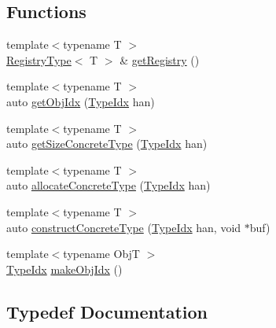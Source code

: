 \subsection*{Functions}
\begin{DoxyCompactItemize}
\item 
{\footnotesize template$<$typename T $>$ }\\\hyperlink{namespacecheckpoint_1_1dispatch_1_1vrt_1_1objregistry_a052bc9d365db250a655ce65d920c5980}{Registry\+Type}$<$ T $>$ \& \hyperlink{namespacecheckpoint_1_1dispatch_1_1vrt_1_1objregistry_acf7bcbb09d5efae1e40034dec911d4c1}{get\+Registry} ()
\item 
{\footnotesize template$<$typename T $>$ }\\auto \hyperlink{namespacecheckpoint_1_1dispatch_1_1vrt_1_1objregistry_a76f3c63243a48165f3e03b90837e2e8a}{get\+Obj\+Idx} (\hyperlink{namespacecheckpoint_1_1dispatch_1_1vrt_acd3f9e6b091bcfbc23dc35ea8ef45d3b}{Type\+Idx} han)
\item 
{\footnotesize template$<$typename T $>$ }\\auto \hyperlink{namespacecheckpoint_1_1dispatch_1_1vrt_1_1objregistry_a34c0cf2100791018c2b07a67a71277db}{get\+Size\+Concrete\+Type} (\hyperlink{namespacecheckpoint_1_1dispatch_1_1vrt_acd3f9e6b091bcfbc23dc35ea8ef45d3b}{Type\+Idx} han)
\item 
{\footnotesize template$<$typename T $>$ }\\auto \hyperlink{namespacecheckpoint_1_1dispatch_1_1vrt_1_1objregistry_a744a3536afb9023749a6857bd1ec9f83}{allocate\+Concrete\+Type} (\hyperlink{namespacecheckpoint_1_1dispatch_1_1vrt_acd3f9e6b091bcfbc23dc35ea8ef45d3b}{Type\+Idx} han)
\item 
{\footnotesize template$<$typename T $>$ }\\auto \hyperlink{namespacecheckpoint_1_1dispatch_1_1vrt_1_1objregistry_a6fa4c97dc40026a2fe6a249e1c9d80e1}{construct\+Concrete\+Type} (\hyperlink{namespacecheckpoint_1_1dispatch_1_1vrt_acd3f9e6b091bcfbc23dc35ea8ef45d3b}{Type\+Idx} han, void $\ast$buf)
\item 
{\footnotesize template$<$typename ObjT $>$ }\\\hyperlink{namespacecheckpoint_1_1dispatch_1_1vrt_acd3f9e6b091bcfbc23dc35ea8ef45d3b}{Type\+Idx} \hyperlink{namespacecheckpoint_1_1dispatch_1_1vrt_1_1objregistry_a1445ce57daead723ea570308104d13ae}{make\+Obj\+Idx} ()
\end{DoxyCompactItemize}


\subsection{Typedef Documentation}
\mbox{\label{namespacecheckpoint_1_1dispatch_1_1vrt_1_1objregistry_a052bc9d365db250a655ce65d920c5980}} 
